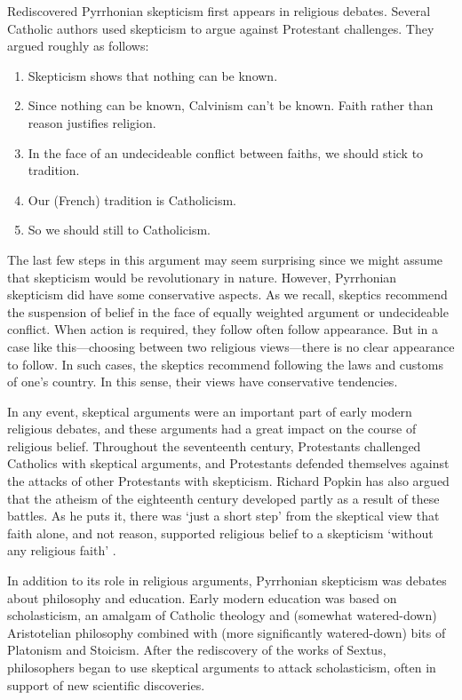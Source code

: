 Rediscovered Pyrrhonian skepticism first appears in religious debates. Several Catholic authors used skepticism to argue against Protestant challenges. They argued roughly as follows:

\begin{enumerate}
    \item Skepticism shows that nothing can be known.
    \item Since nothing can be known, Calvinism can't be known. Faith rather than reason justifies religion.
    \item In the face of an undecideable conflict between faiths, we should stick to tradition.
    \item Our (French) tradition is Catholicism.
    \item So we should still to Catholicism.
\end{enumerate}

The last few steps in this argument may seem surprising since we might assume that skepticism would be revolutionary in nature. However, Pyrrhonian skepticism did have some conservative aspects. As we recall, skeptics recommend the suspension of belief in the face of equally weighted argument or undecideable conflict. When action is required, they follow often follow appearance. But in a case like this---choosing between two religious views---there is no clear appearance to follow. In such cases, the skeptics recommend following the laws and customs of one's country. In this sense, their views have conservative tendencies.

In any event, skeptical arguments were an important part of early modern religious debates, and these arguments had a great impact on the course of religious belief. Throughout the seventeenth century, Protestants challenged Catholics with skeptical arguments, and Protestants defended themselves against the attacks of other Protestants with skepticism. Richard Popkin has also argued that the atheism of the eighteenth century developed partly as a result of these battles. As he puts it, there was `just a short step' from the skeptical view that faith alone, and not reason, supported religious belief to a skepticism `without any religious faith' \citep[19]{popkin1993}.

In addition to its role in religious arguments, Pyrrhonian skepticism was debates about philosophy and education. Early modern education was based on scholasticism, an amalgam of Catholic theology and (somewhat watered-down) Aristotelian philosophy combined with (more significantly watered-down) bits of Platonism and Stoicism. After the rediscovery of the works of Sextus, philosophers began to use skeptical arguments to attack scholasticism, often in support of new scientific discoveries.

